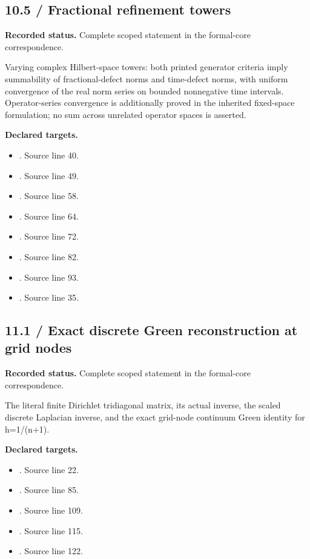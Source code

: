 \subsection{10.5 / Fractional refinement towers}
\label{result:10.5}
\textbf{Recorded status.} Complete scoped statement in the formal-core correspondence.\par
Varying complex Hilbert-space towers: both printed generator criteria imply summability of fractional-defect norms and time-defect norms, with uniform convergence of the real norm series on bounded nonnegative time intervals. Operator-series convergence is additionally proved in the inherited fixed-space formulation; no sum across unrelated operator spaces is asserted.

\textbf{Declared targets.}\begin{itemize}
\item {}. Source line 40.
\item {}. Source line 49.
\item {}. Source line 58.
\item {}. Source line 64.
\item {}. Source line 72.
\item {}. Source line 82.
\item {}. Source line 93.
\item {}. Source line 35.
\end{itemize}
\subsection{11.1 / Exact discrete Green reconstruction at grid nodes}
\label{result:11.1}
\textbf{Recorded status.} Complete scoped statement in the formal-core correspondence.\par
The literal finite Dirichlet tridiagonal matrix, its actual inverse, the scaled discrete Laplacian inverse, and the exact grid-node continuum Green identity for h=1/(n+1).

\textbf{Declared targets.}\begin{itemize}
\item {}. Source line 22.
\item {}. Source line 85.
\item {}. Source line 109.
\item {}. Source line 115.
\item {}. Source line 122.
\end{itemize}
